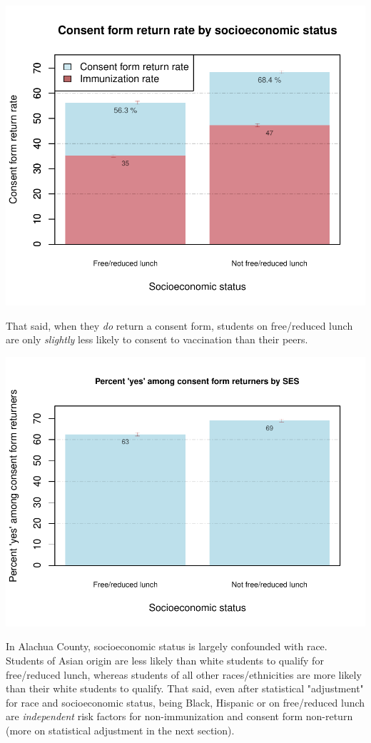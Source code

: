\begin{multicols}{2}
\begin{center}
\includegraphics{targeting-006}
\end{center}

That said, when they \emph{do} return a consent form, students on free/reduced lunch are only \emph{slightly} less likely to consent to vaccination than their peers.  

\begin{center}
\includegraphics{targeting-007}
\end{center}

In Alachua County, socioeconomic status is largely confounded with race. Students of Asian origin are less likely than white students to qualify for free/reduced lunch, whereas students of all other races/ethnicities are more likely than their white students to qualify. That said, even after statistical "adjustment" for race and socioeconomic status, being Black, Hispanic or on free/reduced lunch are \emph{independent} risk factors for non-immunization and consent form non-return (more on statistical adjustment in the next section).


\end{multicols}

